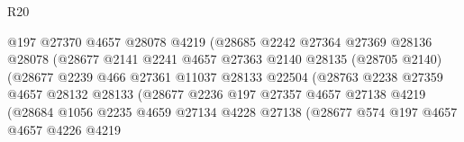 \begin{lexlean}{R20}
\begin{coremodule}
                                    @197
                                    @27370
                                    @4657
                                    @28078
                                    @4219
                                    (@28685
                                      @2242
                                      @27364
                                      @27369
                                      @28136
                                      @28078
                                      (@28677
                                        @2141
                                        @2241
                                        @4657
                                        @27363
                                        @2140
                                        @28135
                                        (@28705 @2140)
                                        (@28677
                                          @2239
                                          @466
                                          @27361
                                          @11037
                                          @28133
                                          @22504
                                          (@28763
                                            @2238
                                            @27359
                                            @4657
                                            @28132
                                            @28133
                                            (@28677
                                              @2236
                                              @197
                                              @27357
                                              @4657
                                              @27138
                                              @4219
                                              (@28684
                                                @1056
                                                @2235
                                                @4659
                                                @27134
                                                @4228
                                                @27138
                                                (@28677
                                                  @574
                                                  @197
                                                  @4657
                                                  @4657
                                                  @4226
                                                  @4219

\end{coremodule}
\end{lexlean}

